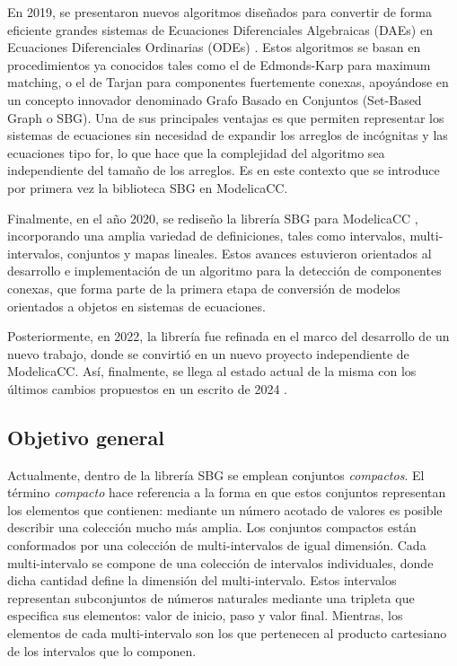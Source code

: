 En 2019, se presentaron nuevos algoritmos diseñados para convertir de forma eficiente grandes sistemas de Ecuaciones Diferenciales Algebraicas (DAEs) en Ecuaciones Diferenciales Ordinarias (ODEs)  \cite{ZFK19}. Estos algoritmos se basan en procedimientos ya conocidos tales como el de Edmonds-Karp para maximum matching, o el de Tarjan para componentes fuertemente conexas, apoyándose en un concepto innovador denominado Grafo Basado en Conjuntos (Set-Based Graph o SBG). Una de sus principales ventajas es que permiten representar los sistemas de ecuaciones sin necesidad de expandir los arreglos de incógnitas y las ecuaciones tipo for, lo que hace que la complejidad del algoritmo sea independiente del tamaño de los arreglos. Es en este contexto que se introduce por primera vez la biblioteca SBG en ModelicaCC.

Finalmente, en el año 2020, se rediseño la librería SBG para ModelicaCC \cite{marzorati20}, incorporando una amplia variedad de definiciones, tales como intervalos, multi-intervalos, conjuntos y mapas lineales. Estos avances estuvieron orientados al desarrollo e implementación de un algoritmo para la detección de componentes conexas, que forma parte de la primera
etapa de conversión de modelos orientados a objetos en sistemas de ecuaciones. 


Posteriormente, en 2022, la librería fue refinada en el marco del desarrollo de un nuevo trabajo, donde se convirtió en un nuevo proyecto independiente de ModelicaCC\cite{marzorati2022efficient}. Así, finalmente, se llega al estado actual de la misma con los últimos cambios propuestos en un escrito de 2024 \cite{marzorati2024efficient}.


\subsection{Objetivo general}

Actualmente, dentro de la librería SBG se emplean conjuntos \textit{compactos}. 
El término \textit{compacto} hace referencia a la forma en que estos conjuntos representan 
los elementos que contienen: mediante un número acotado de valores es posible 
describir una colección mucho más amplia. Los conjuntos compactos están conformados por una colección de multi-intervalos de igual dimensión. Cada multi-intervalo se compone de una colección de intervalos individuales, donde dicha cantidad define la dimensión del multi-intervalo. Estos intervalos representan subconjuntos de números naturales mediante una tripleta que especifica sus elementos: valor de inicio, paso y valor final. Mientras, los elementos de cada multi-intervalo son los que pertenecen al producto cartesiano de los intervalos que lo componen.

